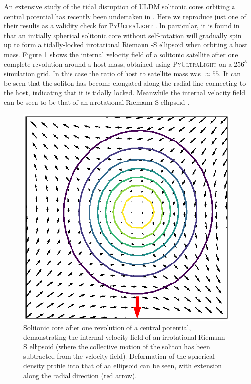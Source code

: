\documentclass[a4paper,11pt]{article}
\newcommand{\PyUltraLight}{\textsc{PyUltraLight }}
\begin{document}
An extensive study of the tidal disruption of ULDM solitonic cores orbiting a central potential has recently been undertaken in \cite{Du2018}. Here we reproduce just one of their results as a validity check for \PyUltraLight. In particular, it is found in \cite{Du2018} that an initially spherical solitonic core without self-rotation will gradually spin up to form a tidally-locked irrotational Riemann -S ellipsoid when orbiting a host mass. Figure \ref{fig:riemann} shows the internal velocity field of a solitonic satellite after one complete revolution around a host mass, obtained using \PyUltraLight on a $256^3$ simulation grid. In this case the ratio of host to satellite mass was $\approx 55$. It can be seen that the soliton has become elongated along the radial line connecting to the host, indicating that it is tidally locked. Meanwhile the internal velocity field can be seen to be that of an irrotational Riemann-S ellipsoid \cite{Daller2012}.
\begin{figure}
  \includegraphics[width=1.\textwidth,trim=1cm 1cm 0 1cm,clip]{riemann}
  \caption{Solitonic core after one revolution of a central potential, demonstrating the internal velocity field of an irrotational Riemann-S ellipsoid (where the collective motion of the soliton has been subtracted from the velocity field). Deformation of the spherical density profile into that of an ellipsoid can be seen, with extension along the radial direction (red arrow).}
  \label{fig:riemann}
\end{figure}
\end{document}
